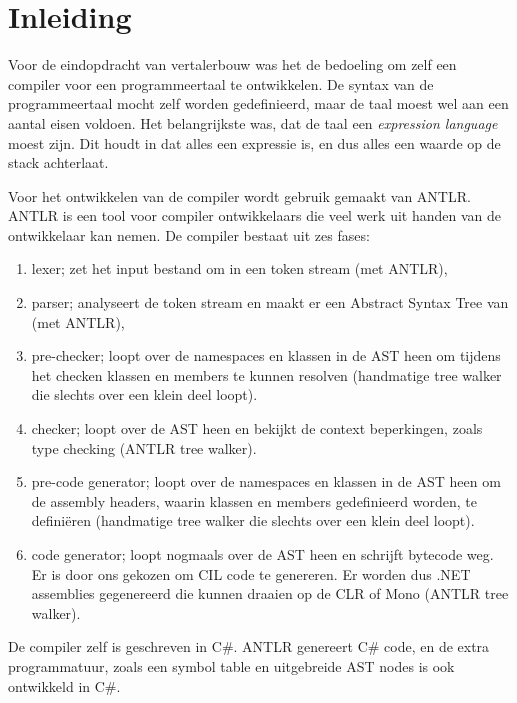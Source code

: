 \section{Inleiding}
Voor de eindopdracht van vertalerbouw was het de bedoeling om zelf een compiler voor een programmeertaal te ontwikkelen. De syntax van de programmeertaal mocht zelf worden gedefinieerd, maar de taal moest wel aan een aantal eisen voldoen. Het belangrijkste was, dat de taal een \emph{expression language} moest zijn. Dit houdt in dat alles een expressie is, en dus alles een waarde op de stack achterlaat.

Voor het ontwikkelen van de compiler wordt gebruik gemaakt van ANTLR. ANTLR is een tool voor compiler ontwikkelaars die veel werk uit handen van de ontwikkelaar kan nemen. De compiler bestaat uit zes fases:
\begin {enumerate}
	\item lexer; zet het input bestand om in een token stream (met ANTLR),
	\item parser; analyseert de token stream en maakt er een Abstract Syntax Tree van (met ANTLR),
	\item pre-checker; loopt over de namespaces en klassen in de AST heen om tijdens het checken klassen en members te kunnen resolven (handmatige tree walker die slechts over een klein deel loopt).
	\item checker; loopt over de AST heen en bekijkt de context beperkingen, zoals type checking (ANTLR tree walker).
	\item pre-code generator; loopt over de namespaces en klassen in de AST heen om de assembly headers, waarin klassen en members gedefinieerd worden, te defini\"eren (handmatige tree walker die slechts over een klein deel loopt).
	\item code generator; loopt nogmaals over de AST heen en schrijft bytecode weg. Er is door ons gekozen om CIL code te genereren. Er worden dus .NET assemblies gegenereerd die kunnen draaien op de CLR of Mono (ANTLR tree walker).
\end {enumerate}

De compiler zelf is geschreven in C\#. ANTLR genereert C\# code, en de extra programmatuur, zoals een symbol table en uitgebreide AST nodes is ook ontwikkeld in C\#.